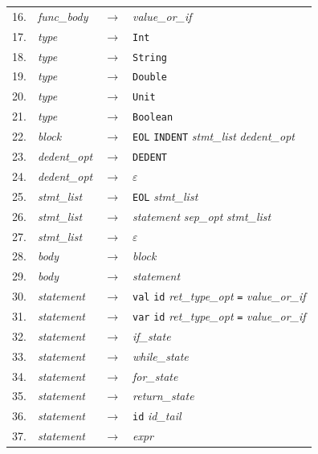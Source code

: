 \documentclass[]{ifjclass}
\begin{document}
\begin{longtable}{r l c l}
16. & \textit{func\_body}    & $\rightarrow$ & \textit{value\_or\_if} \\
17. & \textit{type}          & $\rightarrow$ & \texttt{Int} \\
18. & \textit{type}          & $\rightarrow$ & \texttt{String} \\
19. & \textit{type}          & $\rightarrow$ & \texttt{Double} \\
20. & \textit{type}          & $\rightarrow$ & \texttt{Unit} \\
21. & \textit{type}          & $\rightarrow$ & \texttt{Boolean} \\
22. & \textit{block}         & $\rightarrow$ & \texttt{EOL} \texttt{INDENT} \textit{stmt\_list} \textit{dedent\_opt} \\
23. & \textit{dedent\_opt}   & $\rightarrow$ & \texttt{DEDENT} \\
24. & \textit{dedent\_opt}   & $\rightarrow$ & $\varepsilon$ \\
25. & \textit{stmt\_list}    & $\rightarrow$ & \texttt{EOL} \textit{stmt\_list} \\
26. & \textit{stmt\_list}    & $\rightarrow$ & \textit{statement} \textit{sep\_opt} \textit{stmt\_list} \\
27. & \textit{stmt\_list}    & $\rightarrow$ & $\varepsilon$ \\
28. & \textit{body}          & $\rightarrow$ & \textit{block} \\
29. & \textit{body}          & $\rightarrow$ & \textit{statement} \\
30. & \textit{statement}     & $\rightarrow$ & \texttt{val} \texttt{id} \textit{ret\_type\_opt} \texttt{=} \textit{value\_or\_if} \\
31. & \textit{statement}     & $\rightarrow$ & \texttt{var} \texttt{id} \textit{ret\_type\_opt} \texttt{=} \textit{value\_or\_if} \\
32. & \textit{statement}     & $\rightarrow$ & \textit{if\_state} \\
33. & \textit{statement}     & $\rightarrow$ & \textit{while\_state} \\
34. & \textit{statement}     & $\rightarrow$ & \textit{for\_state} \\
35. & \textit{statement}     & $\rightarrow$ & \textit{return\_state} \\
36. & \textit{statement}     & $\rightarrow$ & \texttt{id} \textit{id\_tail} \\
37. & \textit{statement}     & $\rightarrow$ & \textit{expr} \\

\end{longtable}
\end{document}
